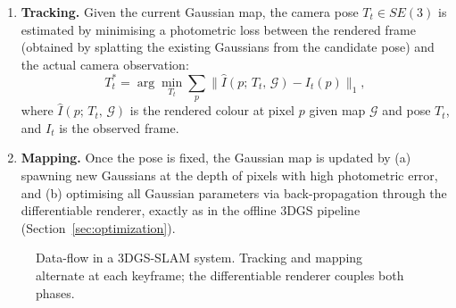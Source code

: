 \begin{enumerate}
  \item \textbf{Tracking.}  Given the current Gaussian map, the camera pose
        $T_t \in SE(3)$ is estimated by minimising a photometric loss between
        the rendered frame (obtained by splatting the existing Gaussians from
        the candidate pose) and the actual camera observation:
        \begin{equation}
          T_t^* = \arg\min_{T_t} \sum_{p} \bigl\|
            \hat{I}(p;\,T_t,\,\mathcal{G}) - I_t(p)
          \bigr\|_1,
          \label{eq:slam_tracking}
        \end{equation}
        where $\hat{I}(p;\,T_t,\,\mathcal{G})$ is the rendered colour at pixel
        $p$ given map $\mathcal{G}$ and pose $T_t$, and $I_t$ is the observed
        frame.

  \item \textbf{Mapping.}  Once the pose is fixed, the Gaussian map is updated
        by (a) spawning new Gaussians at the depth of pixels with high
        photometric error, and (b) optimising all Gaussian parameters via
        back-propagation through the differentiable renderer, exactly as in
        the offline 3DGS pipeline (Section~\ref{sec:optimization}).
\end{enumerate}

\begin{figure}[H]
  \centering
  \caption{Data-flow in a 3DGS-SLAM system.  Tracking and mapping alternate
           at each keyframe; the differentiable renderer couples both phases.}
  \label{fig:slam_pipeline}
\end{figure}


